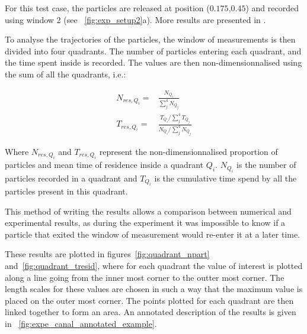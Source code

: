 For this test case, the particles are released at position ($0.175$,$0.45$) and recorded using window 2
(see \figurename~\ref{fig:exp_setup2}a). More results are presented in \citet{Joly2011}.

To analyse the trajectories of the particles, the window of measurements is then divided into four quadrants.
The number of particles entering each quadrant, and the time spent inside is recorded. The values are then
non-dimensionnalised using the sum of all the quadrants, i.e.:

\begin{subequations}
\begin{align}
N_{res,Q_i}=&\frac{N_{Q_i}}{\sum_j^4{N_{Q_j}}}
\\
T_{res,Q_i}=&\frac{T_{Q_i}/\sum_j^4{T_{Q_j}}}{N_{Q_i}/\sum_j^4{N_{Q_j}}}
\end{align}
\end{subequations}

Where $N_{res,Q_i}$ and $T_{res,Q_i}$ represent the non-dimensionnalised proportion of particles and mean time
of residence inside a quadrant $Q_i$. $N_{Q_i}$ is the number of particles recorded in a quadrant and $T_{Q_i}$
is the cumulative time spend by all the particles present in this quadrant.

This method of writing the results allows a comparison between numerical and experimental results, as during the
experiment it was impossible to know if a particle that exited the window of measurement would re-enter it at a later time.

These results are plotted in figures~\ref{fig:quadrant_npart} and~\ref{fig:quadrant_tresid}, where for each quadrant the value
of interest is plotted along a line going from the inner most corner to the outter most corner. The length scales for these
values are chosen in such a way that the maximum value is placed on the outer most corner. The points plotted for each quadrant
are then linked together to form an area. An annotated description of the results is given in \figurename~\ref{fig:expe_canal_annotated_example}.

